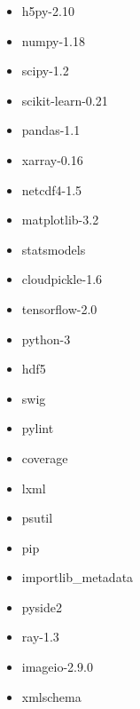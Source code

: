 \begin{itemize}
  \item h5py-2.10
  \item numpy-1.18
  \item scipy-1.2
  \item scikit-learn-0.21
  \item pandas-1.1
  \item xarray-0.16
  \item netcdf4-1.5
  \item matplotlib-3.2
  \item statsmodels
  \item cloudpickle-1.6
  \item tensorflow-2.0
  \item python-3
  \item hdf5
  \item swig
  \item pylint
  \item coverage
  \item lxml
  \item psutil
  \item pip
  \item importlib\_metadata
  \item pyside2
  \item ray-1.3
  \item imageio-2.9.0
  \item xmlschema
\end{itemize}
